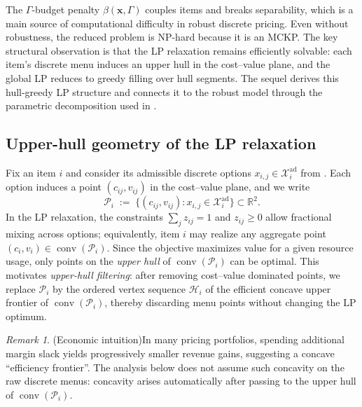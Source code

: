 \documentclass[11pt, a4paper]{article}
\theoremstyle{plain}
\theoremstyle{definition}
\theoremstyle{remark}
\newtheorem{remark}[remark]{Remark}
\begin{document}
The $\Gamma$-budget penalty $\beta(\bm{x},\Gamma)$ couples items and breaks separability, which is a main source of computational difficulty
in robust discrete pricing. Even without robustness, the reduced problem is NP-hard because it is an MCKP. The key structural observation is
that the LP relaxation remains efficiently solvable: each item's discrete menu induces an upper hull in the cost--value plane, and the global
LP reduces to greedy filling over hull segments. The sequel derives this hull-greedy LP structure and connects it to the robust model through
the parametric decomposition used in .

\subsection{Upper-hull geometry of the LP relaxation}\label{subsec:hull_lp}
Fix an item $i$ and consider its admissible discrete options $x_{i,j}\in\mathcal X_i^{\mathrm{ad}}$ from .
Each option induces a point $(c_{ij},v_{ij})$ in the cost--value plane, and we write
\[
\mathcal P_i \;:=\;\{(c_{ij},v_{ij}) : x_{i,j}\in\mathcal X_i^{\mathrm{ad}}\}\subset\mathbb R^2.
\]
In the LP relaxation, the constraints $\sum_j z_{ij}=1$ and $z_{ij}\ge 0$ allow fractional mixing across options; equivalently, item $i$
may realize any aggregate point $(c_i,v_i)\in\operatorname{conv}(\mathcal P_i)$. Since the objective maximizes value for a given resource
usage, only points on the \emph{upper hull} of $\operatorname{conv}(\mathcal P_i)$ can be optimal. This motivates
\emph{upper-hull filtering}: after removing cost--value dominated points, we replace $\mathcal P_i$ by the ordered vertex sequence
$\mathcal H_i$ of the efficient concave upper frontier of $\operatorname{conv}(\mathcal P_i)$, thereby discarding menu points without
changing the LP optimum.

\begin{remark}(Economic intuition)\label{rem:diminishing_returns}
In many pricing portfolios, spending additional margin slack yields progressively smaller revenue gains, suggesting a concave
``efficiency frontier''. The analysis below does not assume such concavity on the raw discrete menus: concavity arises automatically after
passing to the upper hull of $\operatorname{conv}(\mathcal P_i)$.
\end{remark}
\end{document}
